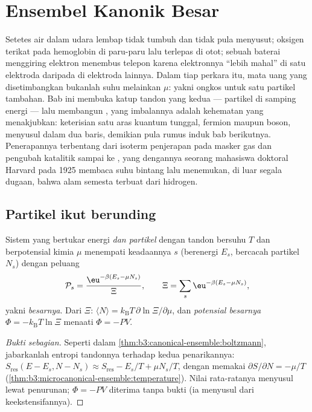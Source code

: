 \chapter{Ensembel Kanonik Besar}\label{ch:b3:grand-canonical}

Setetes air dalam udara lembap tidak tumbuh dan tidak pula menyusut;
oksigen terikat pada hemoglobin di paru-paru lalu terlepas di otot;
sebuah baterai menggiring elektron menembus telepon karena elektronnya
``lebih mahal'' di satu elektroda daripada di elektroda lainnya. Dalam
tiap perkara itu, mata uang yang disetimbangkan bukanlah suhu melainkan
\emph{} $\mu$: yakni ongkos  untuk satu
partikel tambahan. Bab ini membuka katup tandon yang kedua --- partikel
di samping energi --- lalu membangun , yang
imbalannya adalah kehematan yang menakjubkan: keterisian satu aras
kuantum tunggal, fermion maupun boson, menyusul dalam dua baris,
demikian pula rumus induk bab berikutnya. Penerapannya terbentang dari
isoterm penjerapan pada masker gas dan pengubah katalitik sampai ke
, yang dengannya seorang mahasiswa doktoral Harvard pada
1925 membaca suhu bintang lalu menemukan, di luar segala dugaan, bahwa
alam semesta terbuat dari hidrogen.

\section{Partikel ikut berunding}

\begin{theorem}\label{thm:b3:grand-canonical:distribution}
Sistem yang bertukar energi \emph{dan partikel} dengan tandon bersuhu
$T$ dan berpotensial kimia $\mu$ menempati keadaannya $s$
(berenergi $E_s$, bercacah partikel $N_s$) dengan peluang
\[
\mathcal P_s = \frac{\eu^{-\beta(E_s - \mu N_s)}}{\Xi} , \qquad
\Xi = \sum_s\eu^{-\beta(E_s - \mu N_s)} ,
\]
yakni \emph{ besarnya}. Dari $\Xi$: $\langle N\rangle
= k_{\text{B}}T\,\partial\ln\Xi/\partial\mu$, dan \emph{potensial
besarnya} $\Phi = -k_{\text{B}}T\ln\Xi$ menaati $\Phi = -PV$.
\end{theorem}

\begin{proof}[Bukti sebagian]
Seperti dalam \cref{thm:b3:canonical-ensemble:boltzmann}, jabarkanlah
entropi tandonnya terhadap kedua penarikannya:
$S_{\text{res}}(E - E_s, N - N_s) \approx S_{\text{res}} - E_s/T +
\mu N_s/T$, dengan memakai $\partial S/\partial N = -\mu/T$
(\cref{thm:b3:microcanonical-ensemble:temperature}). Nilai rata-ratanya
menyusul lewat penurunan; $\Phi = -PV$ diterima tanpa bukti (ia
menyusul dari keekstensifannya).
\end{proof}


